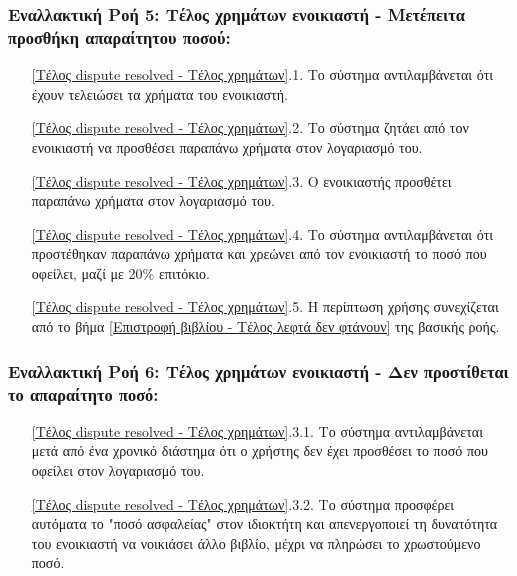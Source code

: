 \documentclass[12pt,a4paper]{article}
\begin{document}
\subsubsection*{Εναλλακτική Ροή 5: Τέλος χρημάτων ενοικιαστή - Μετέπειτα προσθήκη απαραίτητου ποσού:}
\begin{enumerate}
    \item[\ref{Τέλος dispute resolved - Τέλος χρημάτων}.1.] Το σύστημα αντιλαμβάνεται ότι έχουν τελειώσει τα χρήματα του ενοικιαστή.
    \item[\ref{Τέλος dispute resolved - Τέλος χρημάτων}.2.] Το σύστημα ζητάει από τον ενοικιαστή να προσθέσει παραπάνω χρήματα στον λογαριασμό του.
    \item[\ref{Τέλος dispute resolved - Τέλος χρημάτων}.3.] Ο ενοικιαστής προσθέτει παραπάνω χρήματα στον λογαριασμό του.
    \item[\ref{Τέλος dispute resolved - Τέλος χρημάτων}.4.] Το σύστημα αντιλαμβάνεται ότι προστέθηκαν παραπάνω χρήματα και χρεώνει από τον ενοικιαστή το ποσό που οφείλει, μαζί με 20\% επιτόκιο.
    \item[\ref{Τέλος dispute resolved - Τέλος χρημάτων}.5.] Η περίπτωση χρήσης συνεχίζεται από το βήμα \ref{Επιστροφή βιβλίου - Τέλος λεφτά δεν φτάνουν} της βασικής ροής.
\end{enumerate}

\subsubsection*{Εναλλακτική Ροή 6: Τέλος χρημάτων ενοικιαστή - Δεν προστίθεται το απαραίτητο ποσό:}
\begin{enumerate}
    \item[\ref{Τέλος dispute resolved - Τέλος χρημάτων}.3.1.] Το σύστημα αντιλαμβάνεται μετά από ένα χρονικό διάστημα ότι ο χρήστης δεν έχει προσθέσει το ποσό που οφείλει στον λογαριασμό του.
    \item[\ref{Τέλος dispute resolved - Τέλος χρημάτων}.3.2.] Το σύστημα προσφέρει αυτόματα το "ποσό ασφαλείας" στον ιδιοκτήτη και απενεργοποιεί τη δυνατότητα του ενοικιαστή να νοικιάσει άλλο βιβλίο, μέχρι να πληρώσει το χρωστούμενο ποσό.
\end{enumerate}
\end{document}
